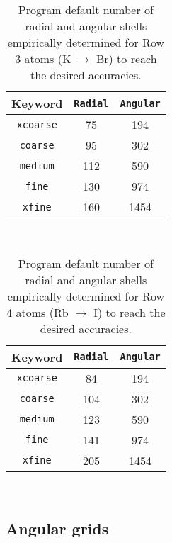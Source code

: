 \begin{table}[h]
\begin{center}
\caption{Program default number of radial and angular shells empirically determined for Row 3 atoms
  (K $\rightarrow$ Br) to reach the desired accuracies.}

\vspace{.2in}

  \begin{tabular}[right]{|c|c|c|} \hline
Keyword & {\tt Radial} & {\tt Angular}  \\ \hline
{\tt xcoarse} & 75 & 194  \\ \hline
{\tt coarse}  & 95 & 302  \\ \hline
{\tt medium}  &112 & 590  \\ \hline
{\tt fine}    &130 & 974  \\ \hline
{\tt xfine}   &160 &1454  \\ \hline
  \end{tabular} \\
\end{center}
\end{table}

\begin{table}[h]
\begin{center}
\caption{Program default number of radial and angular shells empirically determined for Row 4 atoms
  (Rb $\rightarrow$ I) to reach the desired accuracies.}

\vspace{.2in}

  \begin{tabular}[right]{|c|c|c|} \hline
Keyword & {\tt Radial} & {\tt Angular}  \\ \hline
{\tt xcoarse} & 84 &194  \\ \hline
{\tt coarse}  &104 &302  \\ \hline
{\tt medium}  &123 &590  \\ \hline
{\tt fine}    &141 &974  \\ \hline
{\tt xfine}   &205 &1454 \\ \hline
  \end{tabular} \\
\end{center}
\end{table}

\clearpage

\subsection{Angular grids}

